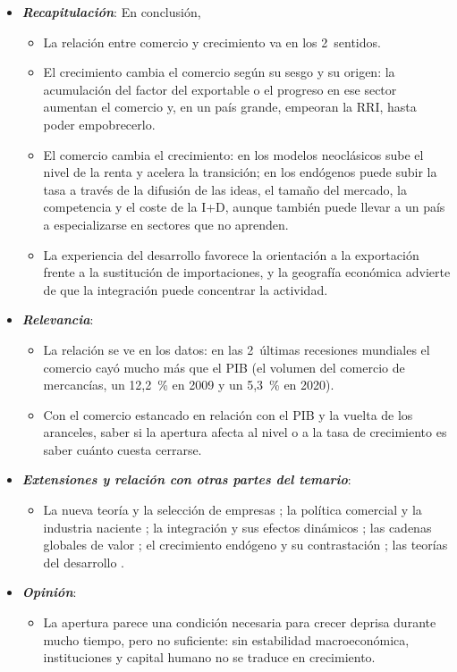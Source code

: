 \documentclass[11pt]{article}
\begin{document}
\begin{itemize}
\item \textbf{\emph{Recapitulación}}: En conclusión,
  \begin{itemize}
  \item La relación entre comercio y crecimiento va en los 2~sentidos.
  \item El crecimiento cambia el comercio según su sesgo y su origen: la acumulación del factor del exportable o el progreso en ese sector aumentan el comercio y, en un país grande, empeoran la RRI, hasta poder empobrecerlo\nocite{Bhagwati1958Immiserizing}.
  \item El comercio cambia el crecimiento: en los modelos neoclásicos sube el nivel de la renta y acelera la transición; en los endógenos puede subir la tasa a través de la difusión de las ideas, el tamaño del mercado, la competencia y el coste de la I+D, aunque también puede llevar a un país a especializarse en sectores que no aprenden.
  \item La experiencia del desarrollo favorece la orientación a la exportación frente a la sustitución de importaciones, y la geografía económica advierte de que la integración puede concentrar la actividad.
  \end{itemize}
\item \textbf{\emph{Relevancia}}:
  \begin{itemize}
  \item La relación se ve en los datos: en las 2~últimas recesiones mundiales el comercio cayó mucho más que el PIB (el volumen del comercio de mercancías, un 12,2~\% en 2009 y un 5,3~\% en 2020)\nocite{OMC2010Comunicado598,OMC2021Comunicado876}.

  \item Con el comercio estancado en relación con el PIB y la vuelta de los aranceles, saber si la apertura afecta al nivel o a la tasa de crecimiento es saber cuánto cuesta cerrarse.
  \end{itemize}
\item \textbf{\emph{Extensiones y relación con otras partes del temario}}:
  \begin{itemize}
  \item La nueva teoría y la selección de empresas ; la política comercial y la industria naciente  ; la integración y sus efectos dinámicos ; las cadenas globales de valor ; el crecimiento endógeno  y su contrastación ; las teorías del desarrollo .
  \end{itemize}
\item \textbf{\emph{Opinión}}:
  \begin{itemize}
  \item La apertura parece una condición necesaria para crecer deprisa durante mucho tiempo, pero no suficiente: sin estabilidad macroeconómica, instituciones y capital humano no se traduce en crecimiento\nocite{RodriguezRodrik2000Trade}.


\end{itemize}
\end{itemize}
\end{document}
